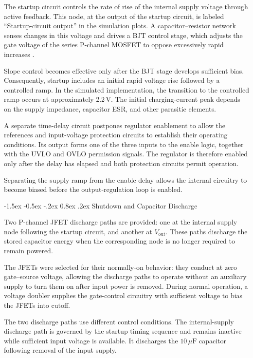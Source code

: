 \documentclass[conference]{IEEEtran}
\makeatletter
\renewcommand\subsection{\@startsection{subsection}{2}{\z@}%
  {-1.5ex \@plus -0.5ex \@minus -.2ex}%
  {0.8ex \@plus .2ex}%
  {\normalfont\sffamily\normalsize\bfseries}}
\makeatother
\begin{document}
The startup circuit controls the rate of rise of the
internal supply voltage through active feedback. This node,
at the output of the startup circuit, is labeled
``Startup-circuit output'' in the simulation plots.
A capacitor--resistor network senses changes in this
voltage and drives a BJT control stage, which adjusts
the gate voltage of the series P-channel MOSFET to
oppose excessively rapid increases
\cite{lathrop_soft_start}.

Slope control becomes effective only after the BJT
stage develops sufficient bias. Consequently, startup
includes an initial rapid voltage rise followed by
a controlled ramp. In the simulated implementation,
the transition to the controlled ramp occurs at
approximately 2.2\,V. The initial charging-current
peak depends on the supply impedance, capacitor ESR,
and other parasitic elements.

A separate time-delay circuit postpones regulator
enablement to allow the references and input-voltage
protection circuits to establish their operating
conditions. Its output forms one of the three inputs
to the enable logic, together with the UVLO and OVLO
permission signals. The regulator is therefore enabled
only after the delay has elapsed and both protection
circuits permit operation.

Separating the supply ramp from the enable delay
allows the internal circuitry to become biased before
the output-regulation loop is enabled.

\subsection{Shutdown and Capacitor Discharge}

Two P-channel JFET discharge paths are provided:
one at the internal supply node following the startup
circuit, and another at \(V_{\mathrm{out}}\).
These paths discharge the stored capacitor energy
when the corresponding node is no longer required
to remain powered.

The JFETs were selected for their normally-on behavior:
they conduct at zero gate--source voltage, allowing
the discharge paths to operate without an auxiliary
supply to turn them on after input power is removed.
During normal operation, a voltage doubler supplies
the gate-control circuitry with sufficient voltage
to bias the JFETs into cutoff.

The two discharge paths use different control conditions.
The internal-supply discharge path is governed by the
startup timing sequence and remains inactive while
sufficient input voltage is available. It discharges
the \(10\,\mu\mathrm{F}\) capacitor following removal
of the input supply.
\end{document}

